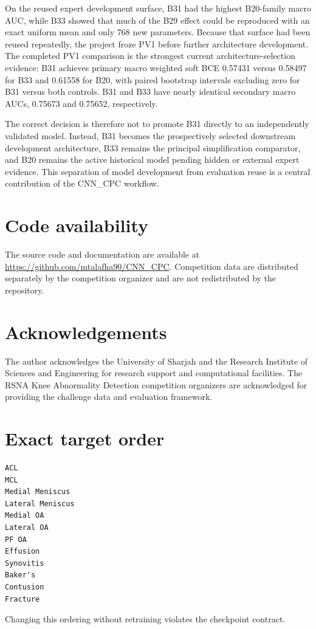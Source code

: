 \documentclass[preprint,12pt]{elsarticle}
\begin{document}
On the reused expert development surface, B31 had the highest B20-family macro AUC, while B33 showed that much of the B29 effect could be reproduced with an exact uniform mean and only 768 new parameters. Because that surface had been reused repeatedly, the project froze PV1 before further architecture development. The completed PV1 comparison is the strongest current architecture-selection evidence: B31 achieves primary macro weighted soft BCE 0.57431 versus 0.58497 for B33 and 0.61558 for B20, with paired bootstrap intervals excluding zero for B31 versus both controls. B31 and B33 have nearly identical secondary macro AUCs, 0.75673 and 0.75652, respectively.

The correct decision is therefore not to promote B31 directly to an independently validated model. Instead, B31 becomes the prospectively selected downstream development architecture, B33 remains the principal simplification comparator, and B20 remains the active historical model pending hidden or external expert evidence. This separation of model development from evaluation reuse is a central contribution of the CNN\_CPC workflow.

\section*{Code availability}
The source code and documentation are available at \url{https://github.com/mtalafha90/CNN_CPC}. Competition data are distributed separately by the competition organizer and are not redistributed by the repository.

\section*{Acknowledgements}
The author acknowledges the University of Sharjah and the Research Institute of Sciences and Engineering for research support and computational facilities. The RSNA Knee Abnormality Detection competition organizers are acknowledged for providing the challenge data and evaluation framework.

\appendix

\section{Exact target order}
\label{app:targets}
\begin{verbatim}
ACL
MCL
Medial Meniscus
Lateral Meniscus
Medial OA
Lateral OA
PF OA
Effusion
Synovitis
Baker's
Contusion
Fracture
\end{verbatim}
Changing this ordering without retraining violates the checkpoint contract.
\end{document}
